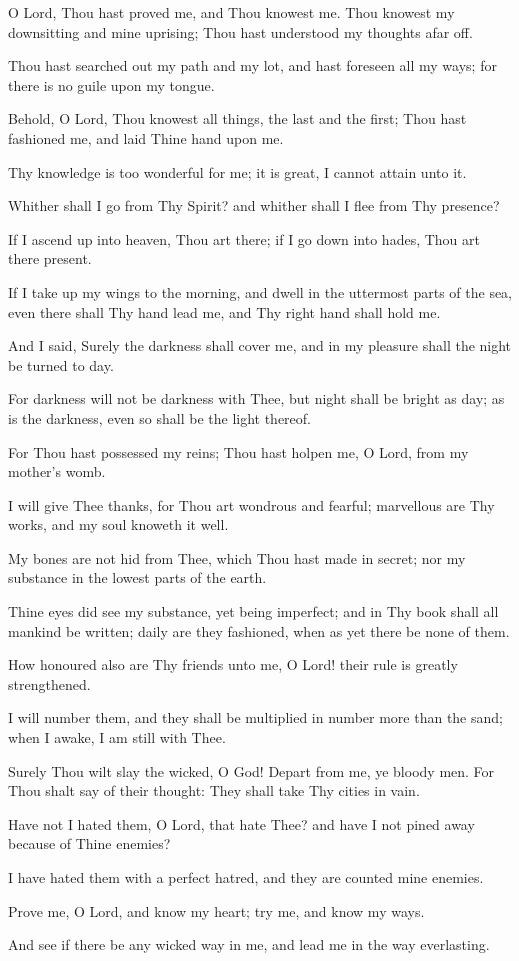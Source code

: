 O Lord, Thou hast proved me, and Thou knowest me. Thou knowest my downsitting and mine uprising; Thou hast understood my thoughts afar off.

Thou hast searched out my path and my lot, and hast foreseen all my ways; for there is no guile upon my tongue.

Behold, O Lord, Thou knowest all things, the last and the first; Thou hast fashioned me, and laid Thine hand upon me.

Thy knowledge is too wonderful for me; it is great, I cannot attain unto it.

Whither shall I go from Thy Spirit? and whither shall I flee from Thy presence?

If I ascend up into heaven, Thou art there; if I go down into hades, Thou art there present.

If I take up my wings to the morning, and dwell in the uttermost parts of the sea, even there shall Thy hand lead me, and Thy right hand shall hold me.

And I said, Surely the darkness shall cover me, and in my pleasure shall the night be turned to day.

For darkness will not be darkness with Thee, but night shall be bright as day; as is the darkness, even so shall be the light thereof.

For Thou hast possessed my reins; Thou hast holpen me, O Lord, from my mother's womb.

I will give Thee thanks, for Thou art wondrous and fearful; marvellous are Thy works, and my soul knoweth it well.

My bones are not hid from Thee, which Thou hast made in secret; nor my substance in the lowest parts of the earth.

Thine eyes did see my substance, yet being imperfect; and in Thy book shall all mankind be written; daily are they fashioned, when as yet there be none of them.

How honoured also are Thy friends unto me, O Lord! their rule is greatly strengthened.

I will number them, and they shall be multiplied in number more than the sand; when I awake, I am still with Thee.

Surely Thou wilt slay the wicked, O God! Depart from me, ye bloody men. For Thou shalt say of their thought: They shall take Thy cities in vain.

Have not I hated them, O Lord, that hate Thee? and have I not pined away because of Thine enemies?

I have hated them with a perfect hatred, and they are counted mine enemies.

Prove me, O Lord, and know my heart; try me, and know my ways.

And see if there be any wicked way in me, and lead me in the way everlasting.
